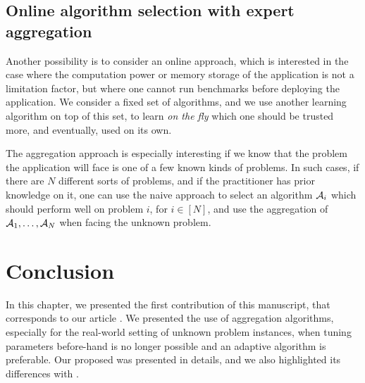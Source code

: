 


\subsection{Online algorithm selection with expert aggregation}

Another possibility is to consider an online approach, which is interested in the case where the computation power or memory storage of the application is not a limitation factor, but where one cannot run benchmarks before deploying the application.
We consider a fixed set of algorithms, and we use another learning algorithm on top of this set, to learn \emph{on the fly} which one should be trusted more, and eventually, used on its own.

The aggregation approach is especially interesting if we know that the problem the application will face is one of a few known kinds of problems.
In such cases, if there are $N$ different sorts of problems, and if the practitioner has prior knowledge on it, one can use the naive approach to select an algorithm $\mathcal{A}_i$ which should perform well on problem $i$, for $i\in[N]$,
and use the aggregation of $\mathcal{A}_1,\dots,\mathcal{A}_N$ when facing the unknown problem.







\section{Conclusion}
\label{sec:25:conclusion}

In this chapter, we presented the first contribution of this manuscript,
that corresponds to our article \cite{Besson2018WCNC}.
%
We presented the use of aggregation algorithms,
especially for the real-world setting of unknown problem instances,
when tuning parameters before-hand is no longer possible and an adaptive algorithm is preferable.
Our proposed \Aggr{} was presented in details,
and we also highlighted its differences with \ExpQ.

